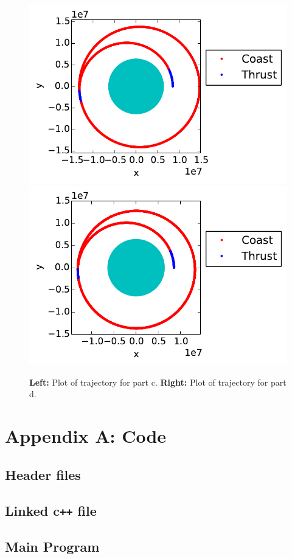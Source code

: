 \documentclass[cleanfoot,cleanhead,onecolumn,10pt,notitlepage]{asme2e}
\begin{document}
\begin{figure}[t]
\begin{center}
    \includegraphics[width=0.45\linewidth]{../python_stuff/part_c.pdf}
    \includegraphics[width=0.45\linewidth]{../python_stuff/part_d.pdf}
    
    \caption{\textbf{Left: }Plot of trajectory for part c.  \textbf{Right: }Plot of trajectory for part d.}
    \label{fig:cd}
\end{center}
\end{figure}


\appendix

\section{Appendix A: Code}
\label{sec:code}
\subsection*{Header files}


\subsection*{Linked c\texttt{++} file}

\subsection*{Main Program}

\end{document}
